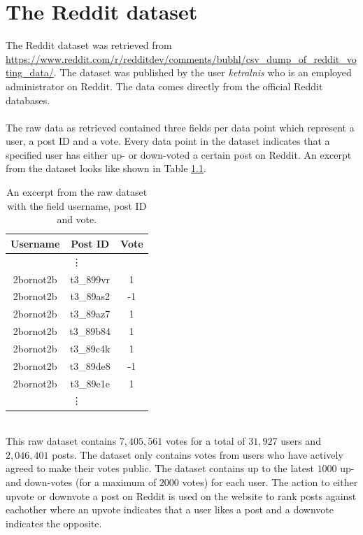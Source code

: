 \chapter{The Reddit dataset}\label{appendix:reddit}
The Reddit dataset was retrieved from \url{https://www.reddit.com/r/redditdev/comments/bubhl/csv_dump_of_reddit_voting_data/}. The dataset was published by the user \textit{ketralnis} who is an employed administrator on Reddit. The data comes directly from the official Reddit databases.
\\\\
The raw data as retrieved contained three fields per data point which represent a user, a post ID and a vote. Every data point in the dataset indicates that a specified user has either up- or down-voted a certain post on Reddit. An excerpt from the dataset looks like shown in Table \ref{table:reddit_raw_excerpt}.
\begin{table}[h!]
    \centering
    \begin{tabular}{ c c c } 
        \hline
        \textbf{Username} & \textbf{Post ID} & \textbf{Vote} \\
        \hline
        \multicolumn{3}{c}{\vdots} \\
        2bornot2b & t3\_899vr & 1 \\
        2bornot2b & t3\_89as2 & -1 \\
        2bornot2b & t3\_89az7 & 1 \\
        2bornot2b & t3\_89b84 & 1 \\
        2bornot2b & t3\_89c4k & 1 \\
        2bornot2b & t3\_89de8 & -1 \\
        2bornot2b & t3\_89e1e & 1 \\
        \multicolumn{3}{c}{\vdots} \\
    \end{tabular}
    \caption{An excerpt from the raw dataset with the field username, post ID and vote.}
    \label{table:reddit_raw_excerpt}
\end{table}
\\
This raw dataset contains $7,405,561$ votes for a total of $31,927$ users and $ 2,046,401$ posts. The dataset only contains votes from users who have actively agreed to make their votes public. The dataset contains up to the latest $1000$ up- and down-votes (for a maximum of $2000$ votes) for each user. The action to either upvote or downvote a post on Reddit is used on the website to rank posts against eachother where an upvote indicates that a user likes a post and a downvote indicates the opposite. 
